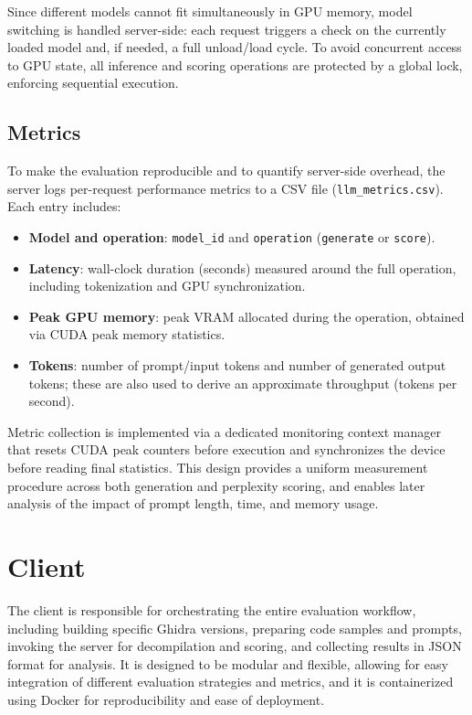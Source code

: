 Since different models cannot fit simultaneously in \ac{GPU} memory, model switching is handled server-side: each request triggers a check on the currently loaded model and, if needed, a full unload/load cycle. To avoid concurrent access to \ac{GPU} state, all inference and scoring operations are protected by a global lock, enforcing sequential execution.

\subsection{Metrics}
To make the evaluation reproducible and to quantify server-side overhead, the server logs per-request performance metrics to a CSV file (\texttt{llm\_metrics.csv}). Each entry includes:

\begin{itemize}
    \item \textbf{Model and operation}: \texttt{model\_id} and \texttt{operation} (\texttt{generate} or \texttt{score}).
    \item \textbf{Latency}: wall-clock duration (seconds) measured around the full operation, including tokenization and \ac{GPU} synchronization.
    \item \textbf{Peak GPU memory}: peak \ac{VRAM} allocated during the operation, obtained via CUDA peak memory statistics.
    \item \textbf{Tokens}: number of prompt/input tokens and number of generated output tokens; these are also used to derive an approximate throughput (tokens per second).
\end{itemize}

Metric collection is implemented via a dedicated monitoring context manager that resets CUDA peak counters before execution and synchronizes the device before reading final statistics. 
This design provides a uniform measurement procedure across both generation and perplexity scoring, and enables later analysis of the impact of prompt length, time, and memory usage.

\section{Client}

The client is responsible for orchestrating the entire evaluation workflow, including building specific Ghidra versions, preparing code samples and prompts, invoking the server for decompilation and scoring, and collecting results in \ac{JSON} format for analysis.
It is designed to be modular and flexible, allowing for easy integration of different evaluation strategies and metrics, and it is containerized using Docker for reproducibility and ease of deployment.

